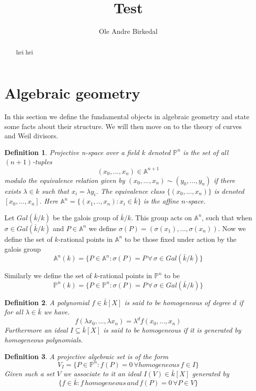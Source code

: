 \documentclass[a4paper,10pt]{amsart}
\title{Test}
\author{Ole Andre Birkedal}
\begin{document}
\newtheorem{mydef}{Definition}
\newtheorem{ex}{Example}
\newtheorem{prop}{Proposition}

\maketitle
\begin{abstract}
hei hei
\end{abstract}

\section{Algebraic geometry}
In this section we define the fundamental objects in algebraic geometry and state
some facts about their structure. We will then move on to the theory of
curves and Weil divisors.

\begin{mydef}
\emph{Projective n-space} over a field $k$ denoted $\mathbb{P}^n$ is the set 
of all $(n+1)$-tuples $$(x_0,...,x_n)\in\mathbb{A}^{n+1}$$
modulo the equivalence relation given by $(x_0,...,x_n)\sim(y_0,...,y_n)$ 
if there exists $\lambda\in k$ such that $x_i=\lambda y_i$.
The equivalence class $\{(x_0,...,x_n)\}$ is denoted $[x_0,...,x_n]$.
Here $\mathbb{A}^n = \{ (x_1,..,x_n) : x_i \in \bar{k} \} $ is the affine $n$-space.
\end{mydef}

Let $Gal(\bar{k}/k)$ be the galois group of $\bar{k}/k$. This group acts on
$\mathbb{A}^n$, such that when $\sigma \in Gal(\bar{k}/k)$ and $P\in \mathbb{A}^n$
we define $\sigma(P) = (\sigma(x_1),...,\sigma(x_n))$. Now we define
the set of $k$-rational points in $\mathbb{A}^n$ to be those fixed under action by
the galois group
$$ \mathbb{A}^n(k) = \{ P \in \mathbb{A}^n : \sigma(P) = P\, \forall\, \sigma \in
Gal(\bar{k}/k) \} $$

Similarly we define the set of $k$-rational points in $\mathbb{P}^n$ to be
$$ \mathbb{P}^n(k) = \{ P \in \mathbb{P}^n : \sigma(P) = P\, \forall\, \sigma \in 
Gal(\bar{k}/k) \} $$

\begin{mydef}
 A polynomial $f\in\bar{k}[X]$ is said to be \emph{homogeneous of degree $d$} if for all
$\lambda\in\bar{k}$ we have.
$$f(\lambda x_0,...,\lambda x_n) = \lambda^d f(x_0,...,x_n)$$
Furthermore an ideal $I\subseteq\bar{k}[X]$ is said to be homogeneous if it is generated
by homogeneous polynomials.
\end{mydef}

\begin{mydef}
 A \emph{projective algebraic set} is of the form
$$ V_I = \{ P\in \mathbb{P}^n : f(P) = 0\, \forall homogeneous\, f\in I \} $$
Given such a set $V$ we associate to it an ideal $I(V) \in \bar{k}[X]$ generated by
$$ \{f\in\bar{k} : f\, homogeneous\, and\, f(P)=0\, \forall P\in V \} $$
\end{mydef}
\end{document}
